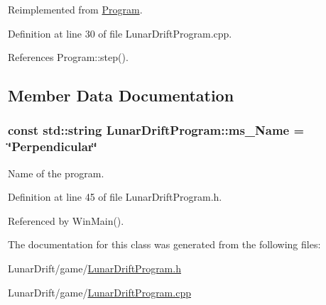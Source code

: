 Reimplemented from \hyperlink{class_program_a975de71413195823c525955cfd5f2ca7}{Program}.



Definition at line 30 of file Lunar\+Drift\+Program.\+cpp.



References Program\+::step().



\subsection{Member Data Documentation}
\subsubsection[{\texorpdfstring{ms\+\_\+\+Name}{ms_Name}}]{\setlength{\rightskip}{0pt plus 5cm}const std\+::string Lunar\+Drift\+Program\+::ms\+\_\+\+Name = \char`\"{}Perpendicular\char`\"{}\hspace{0.3cm}{\ttfamily [static]}}\hypertarget{class_lunar_drift_program_a2b61915181711d5987e168c74d9beaac}{}\label{class_lunar_drift_program_a2b61915181711d5987e168c74d9beaac}


Name of the program. 



Definition at line 45 of file Lunar\+Drift\+Program.\+h.



Referenced by Win\+Main().



The documentation for this class was generated from the following files\+:\begin{DoxyCompactItemize}
\item 
Lunar\+Drift/game/\hyperlink{_lunar_drift_program_8h}{Lunar\+Drift\+Program.\+h}\item 
Lunar\+Drift/game/\hyperlink{_lunar_drift_program_8cpp}{Lunar\+Drift\+Program.\+cpp}\end{DoxyCompactItemize}
